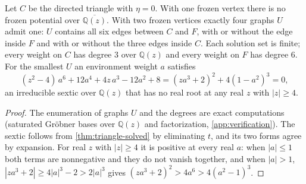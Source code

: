 \documentclass[final]{siamart0516}
\numberwithin{theorem}{section}
\numberwithin{equation}{section}
\theoremstyle{siamnonum}
\theoremstyle{plain}
\newcommand{\QQ}{\mathbb{Q}}
\newcommand{\Qz}{\QQ(z)}
\newcommand{\Qzbar}{\overline{\QQ(z)}}
\begin{document}
\begin{proposition}\label{prop:env-barrier}
Let $C$ be the directed triangle with $\eta=0$. With one frozen vertex there is no frozen potential over $\Qzbar$. With two frozen vertices exactly four graphs $U$ admit one: $U$ contains all six edges between $C$ and $F$, with or without the edge inside $F$ and with or without the three edges inside $C$. Each solution set is finite; every weight on $C$ has degree $3$ over $\Qz$ and every weight on $F$ has degree $6$. For the smallest $U$ an environment weight $a$ satisfies
\[
(z^{2}-4)\,a^{6}+12a^{4}+4z\,a^{3}-12a^{2}+8=(za^{3}+2)^{2}+4(1-a^{2})^{3}=0,
\]
an irreducible sextic over $\Qz$ that has no real root at any real $z$ with $|z|\ge4$.
\end{proposition}
\begin{proof}
The enumeration of graphs $U$ and the degrees are exact computations (saturated Gr\"obner bases over $\Qz$ and factorization, \cref{app:verification}). The sextic follows from \cref{thm:triangle-solved} by eliminating $t$, and its two forms agree by expansion. For real $z$ with $|z|\ge4$ it is positive at every real $a$: when $|a|\le1$ both terms are nonnegative and they do not vanish together, and when $|a|>1$, $|za^{3}+2|\ge4|a|^3-2>2|a|^{3}$ gives $(za^{3}+2)^{2}>4a^{6}>4(a^{2}-1)^{3}$.
\end{proof}
\end{document}
